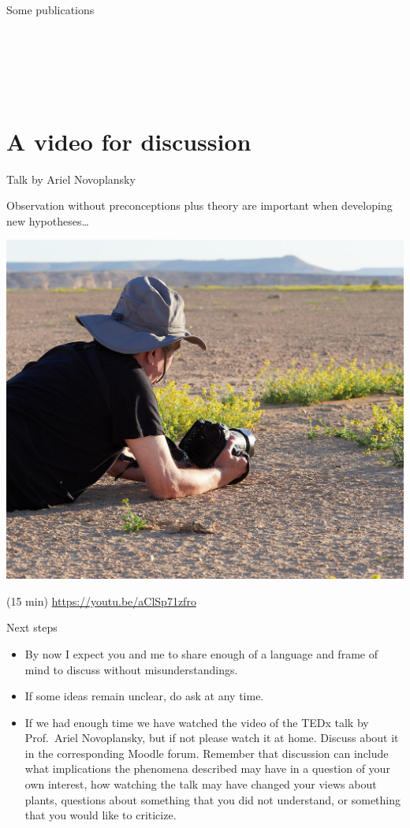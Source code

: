\documentclass[10pt]{beamer}
\begin{document}
\begin{frame}{Some publications}
   \cite{Zhu2010}\\
   \cite{Denison2012}\\
   \cite{Evans2013}\\
   \cite{Sadras2021}\\
   \cite{Passioura2020}\\
   \cite{Sinclair2019}\\
\end{frame}

\section{A video for discussion}
\nocite{Falik2011,Falik2012,Novoplansky2021}

\begin{frame}{Talk by Ariel Novoplansky \Video}

Observation without preconceptions plus theory are important when developing new hypotheses\ldots

\includegraphics[width=0.5\linewidth]{photos/ariel}

 \Video (15 min) \url{https://youtu.be/aClSp71zfro}

\end{frame}


\begin{frame}{Next steps \Discussion}
\begin{itemize}
  \item By now I expect you and me to share enough of a language and frame of mind to discuss without misunderstandings.
  \item If some ideas remain unclear, do ask at any time.
  \item If we had enough time we have watched the video of the TEDx talk by Prof.\ Ariel Novoplansky, but if not please watch it at home. Discuss about it in the corresponding Moodle forum. Remember that discussion can include what implications the phenomena described may have in a question of your own interest, how watching the talk may have changed your views about plants, questions about something that you did not understand, or something that you would like to criticize.
\end{itemize}

\end{frame}
\end{document}
